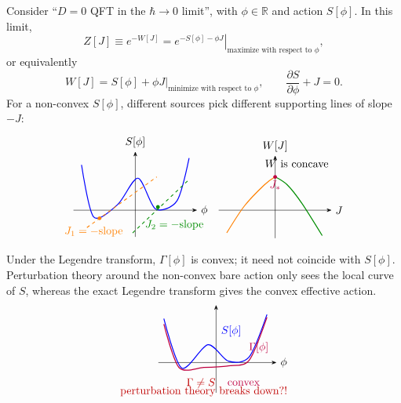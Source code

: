 Consider ``\(D=0\) QFT in the \(\hbar\to0\) limit'', with
\(\phi\in\mathbb R\) and action \(S[\phi]\).  In this limit,
\[
  Z[J]\equiv e^{-W[J]}
  =
  \left.
  e^{-S[\phi]-\phi J}
  \right|_{\text{maximize with respect to }\phi},
\]
or equivalently
\[
  W[J]
  =
  \left.
  S[\phi]+\phi J
  \right|_{\text{minimize with respect to }\phi},
  \qquad
  \frac{\partial S}{\partial\phi}+J=0.
\]
For a non-convex \(S[\phi]\), different sources pick different supporting
lines of slope \(-J\):
\[
\begin{tikzpicture}[>=Stealth,scale=0.86]
  \begin{scope}
    \draw[->] (-2.3,0) -- (2.3,0) node[right] {\(\phi\)};
    \draw[->] (0,-1.0) -- (0,2.2) node[above] {\(S[\phi]\)};
    \draw[blue,line width=0.85pt]
      plot[smooth] coordinates {
        (-2.0,1.7) (-1.55,-0.25) (-0.65,0.22)
        (0.1,1.2) (0.75,0.05) (1.55,0.35) (2.0,1.95)
      };
    \draw[orange,dashed,line width=0.75pt] (-1.8,-0.65) -- (0.8,1.25);
    \draw[green!55!black,dashed,line width=0.75pt] (-0.1,-0.85) -- (2.0,1.15);
    \fill[orange] (-1.33,-0.30) circle (2pt);
    \fill[green!55!black] (0.84,0.12) circle (2pt);
    \node[orange] at (-1.55,-0.8) {\(J_1=-\text{slope}\)};
    \node[green!55!black] at (1.45,-0.55) {\(J_2=-\text{slope}\)};
  \end{scope}
  \begin{scope}[xshift=5.2cm]
    \draw[->] (-2.1,0) -- (2.1,0) node[right] {\(J\)};
    \draw[->] (0,-1.05) -- (0,2.05) node[above] {\(W[J]\)};
    \draw[orange,line width=0.85pt]
      plot[smooth] coordinates {(-1.8,-0.85) (-1.15,0.15) (-0.4,0.95) (0,1.25)};
    \draw[green!55!black,line width=0.85pt]
      plot[smooth] coordinates {(0,1.25) (0.45,0.95) (1.0,0.25) (1.75,-0.95)};
    \fill[purple] (0,1.25) circle (2pt);
    \node[purple,below] at (0,1.25) {\(J_\ast\)};
    \node at (0.8,1.75) {\(W\text{ is concave}\)};
  \end{scope}
\end{tikzpicture}
\]
Under the Legendre transform, \(\Gamma[\phi]\) is convex; it need not
coincide with \(S[\phi]\).  Perturbation theory around the non-convex
bare action only sees the local curve of \(S\), whereas the exact
Legendre transform gives the convex effective action.
\[
\begin{tikzpicture}[>=Stealth,scale=0.88]
  \draw[->] (-2.1,0) -- (2.2,0) node[right] {\(\phi\)};
  \draw[->] (0,-1.1) -- (0,2.1);
  \draw[blue,line width=0.85pt]
    plot[smooth] coordinates {
      (-1.9,1.6) (-1.25,-0.2) (-0.3,0.65)
      (0.45,0.05) (1.2,0.2) (1.85,1.75)
    };
  \draw[purple,line width=0.9pt]
    plot[smooth] coordinates {
      (-1.9,1.4) (-1.35,-0.18) (-0.45,-0.18)
      (0.45,-0.12) (1.2,0.08) (1.85,1.65)
    };
  \node[blue] at (0.55,1.15) {\(S[\phi]\)};
  \node[purple] at (1.55,0.55) {\(\Gamma[\phi]\)};
  \node[purple] at (1.0,-0.75) {convex};
  \node[red!75!black] at (-0.55,-0.75) {\(\Gamma\ne S\)};
  \node[red!75!black] at (-0.45,-1.05) {perturbation theory breaks down?!};
\end{tikzpicture}
\]

